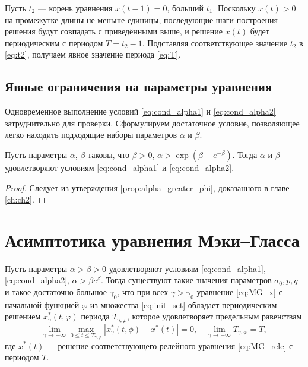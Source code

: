 Пусть $t_2$ --- корень уравнения $x(t - 1) = 0$, больший $t_1$. Поскольку $x(t) > 0$ на промежутке длины не меньше единицы, последующие шаги построения решения будут совпадать с приведёнными выше, и решение $x(t)$ будет периодическим с периодом $T = t_2 - 1$. Подставляя соответствующее значение $t_2$ в \eqref{eq:t2}, получаем явное значение периода \eqref{eq:T}.


\subsection{Явные ограничения на параметры уравнения}

Одновременное выполнение условий \eqref{eq:cond_alpha1} и \eqref{eq:cond_alpha2} затруднительно для проверки. Сформулируем достаточное условие, позволяющее легко находить подходящие наборы параметров $\alpha$ и $\beta$.

\begin{theorem}
Пусть параметры $\alpha$, $\beta$ таковы, что $\beta > 0$, $\alpha > \exp(\beta + e^{-\beta})$. Тогда $\alpha$ и $\beta$ удовлетворяют условиям \eqref{eq:cond_alpha1} и \eqref{eq:cond_alpha2}.
\end{theorem}
\begin{proof}
	Следует из утверждения \ref{prop:alpha_greater_phi}, доказанного в главе \ref{ch:ch2}.
\end{proof}

\section{Асимптотика уравнения Мэки--Гласса}


\begin{theorem}
    \label{thm:existence}
Пусть параметры $\alpha > \beta > 0$ удовлетворяют условиям \eqref{eq:cond_alpha1}, \eqref{eq:cond_alpha2}, $\alpha > \beta e^{\beta}$. Тогда существуют такие значения параметров $\sigma_0, p, q$ и такое достаточно большое $\gamma_0$, что при всех $\gamma > \gamma_0$ уравнение \eqref{eq:MG_x} с начальной функцией $\varphi$ из множества \eqref{eq:init_set} обладает периодическим решением $x^*_\gamma(t, \varphi)$ периода $T_{\gamma, \varphi}$, которое удовлетворяет предельным равенствам 
\begin{equation}
\label{eq:lim_x*}
	\lim_{\gamma\to+\infty}\max_{0\leqslant t\leqslant T_{\gamma, \varphi}}|x_{\gamma}^*(t, \phi)-x^*(t)|=0,\quad \lim_{\gamma\to+\infty}T_{\gamma, \varphi} = T,
\end{equation}
где $x^*(t)$ --- решение соответствующего релейного уравнения \eqref{eq:MG_rele} с периодом $T$.
\end{theorem}

